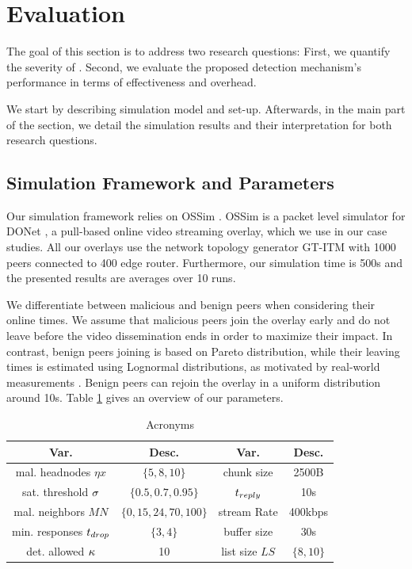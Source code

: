 \section{Evaluation}
\label{sec:eval}

The goal of this section is to address two research questions: 
First, we quantify the severity of \drop. 
Second, we evaluate the proposed detection mechanism's performance in terms of effectiveness and overhead. 

We start by describing simulation model and set-up. 
Afterwards, in the main part of the section, we detail the simulation results and their interpretation for both research questions.

\subsection{Simulation Framework and Parameters}
Our simulation framework relies on OSSim \cite{nguyen2013ossim}. 
OSSim is a packet level simulator for DONet \cite{zhang2005coolstreaming}, a pull-based online video streaming overlay, which we use in our case studies.
All our overlays use the network topology generator GT-ITM \cite{GT} with 1000 peers connected to 400 edge router. Furthermore, our simulation time is 500s and the presented results are averages over 10 runs. 

We differentiate between malicious and benign peers when considering their online times. 
We assume that malicious peers join the overlay early and do not leave before the video dissemination ends in order to maximize their impact. 
In contrast,  benign peers joining is based on Pareto distribution, while their leaving times is estimated using Lognormal distributions, as motivated by real-world measurements \cite{distribution}.
Benign peers can rejoin the overlay in a uniform distribution around 10s.
Table \ref{tab:parameters} gives an overview of our parameters. 

\begin{table}[ht]
\center
\caption{Acronyms}
\begin{tabular}{|c|c||c|c|}
\hline

\bf{Var.} & \bf{Desc.}  & \bf{Var.} & \bf{Desc.} \\\hline\hline

mal. headnodes $\eta x$ & $\{5,8,10\}$ & chunk size & 2500B \\\hline
sat. threshold $\sigma$ & $\{0.5,0.7,0.95\}$ & $t_{reply}$ & 10s\\\hline
mal. neighbors $MN$  & $\{0,15,24,70,100\}$ & stream Rate & 400kbps\\\hline
min. responses $t_{drop}$ &  $\{3,4\}$ & buffer size & 30s  \\\hline
det. allowed $\kappa$ & 10 & list size $LS$ & $\{8,10\}$\\\hline
  
\end{tabular}
\label{tab:parameters}
\end{table}
\vspace{-2.5mm}
